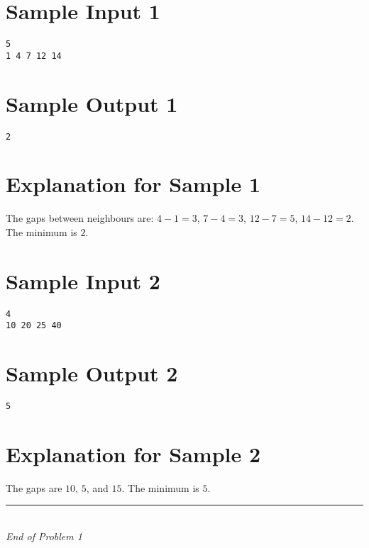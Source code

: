 \documentclass[12pt,a4paper]{article}
\begin{document}
\section*{Sample Input 1}
\begin{verbatim}
5
1 4 7 12 14
\end{verbatim}

\section*{Sample Output 1}
\begin{verbatim}
2
\end{verbatim}

\section*{Explanation for Sample 1}
The gaps between neighbours are:  
$4-1=3$, $7-4=3$, $12-7=5$, $14-12=2$.  
The minimum is $2$.

\section*{Sample Input 2}
\begin{verbatim}
4
10 20 25 40
\end{verbatim}

\section*{Sample Output 2}
\begin{verbatim}
5
\end{verbatim}

\section*{Explanation for Sample 2}
The gaps are $10$, $5$, and $15$.  
The minimum is $5$.

\vfill
\begin{center}
    \rule{0.8\textwidth}{0.4pt} \\[0.5em]
    \textit{End of Problem 1}
\end{center}
\end{document}
